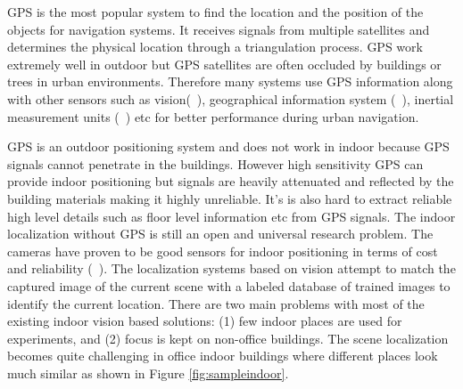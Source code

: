 GPS is the most popular system to find the location
and the position of the objects for navigation systems. 
It receives signals from multiple satellites 
and determines the physical location through a 
triangulation process. 
GPS work extremely well in outdoor 
but GPS satellites are often 
occluded by buildings or trees in urban environments. 
Therefore many systems use GPS information along with 
other sensors such as vision(~\cite{agrawal06, leung08}), 
geographical information system (~\cite{ boonifait08}), 
inertial measurement units (~\cite{georgy11}) etc 
for better performance during urban navigation. 


GPS is an outdoor positioning system 
and does not work in indoor because GPS 
signals cannot penetrate in the buildings. 
However high sensitivity GPS can provide indoor 
positioning but signals are heavily attenuated 
and reflected by the building materials making it 
highly unreliable. It's is also hard to extract reliable 
high level details such as floor level information 
etc from GPS signals. 
The indoor localization without GPS is still an open 
and universal research problem. 
The cameras have proven to be 
good sensors for indoor positioning 
in terms of cost and reliability (~\cite{davidf07, hongwen09}). 
The localization systems based on vision attempt 
to match the captured image of the current scene 
with a labeled database 
of trained images to identify the current location. 
There are two main problems with most of the existing 
indoor vision based solutions: (1) few indoor places are used 
for experiments, and (2) focus is kept on non-office buildings.
The scene localization becomes quite 
challenging in office indoor buildings where 
different places look much similar as shown in 
Figure \ref{fig:sampleindoor}. 

